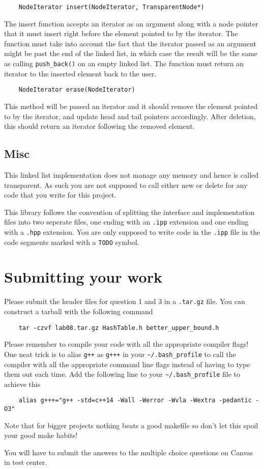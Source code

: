 \documentclass{article}
\begin{document}
\begin{lstlisting}
    NodeIterator insert(NodeIterator, TransparentNode*)
\end{lstlisting}
The insert function accepts an iterator as an argument along with a node
pointer that it must insert right before the element pointed to by the
iterator.  The function must take into account the fact that the iterator
passed as an argument might be past the end of the linked list, in which case
the result will be the same as calling \texttt{push\_back()} on an empty
linked list.  The function must return an iterator to the inserted element
back to the user.

\begin{lstlisting}
    NodeIterator erase(NodeIterator)
\end{lstlisting}
This method will be passed an iterator and it should remove the element
pointed to by the iterator, and update head and tail pointers accordingly.
After deletion, this should return an iterator following the removed element.

\subsection{Misc}
This linked list implementation does not manage any memory and hence is called
transparent.  As such you are not supposed to call either new or delete for
any code that you write for this project.

This library follows the convention of splitting the interface and
implementation files into two seperate files, one ending with an \texttt{.ipp}
extension and one ending with a \texttt{.hpp} extension.  You are only
supposed to write code in the \texttt{.ipp} file in the code segments marked
with a \texttt{TODO} symbol.


\newpage
\section{Submitting your work}
Please submit the header files for question
1 and 3 in a \texttt{.tar.gz} file.  You can construct a tarball with the
following command
\begin{lstlisting}
    tar -czvf lab08.tar.gz HashTable.h better_upper_bound.h
\end{lstlisting}

Please remember to compile your code with all the appropriate compiler flags!
One neat trick is to alias \texttt{g++} as \texttt{g+++} in your
\texttt{\~{}/.bash\_profile} to call the compiler with all the appropriate
command line flags instead of having to type them out each time.  Add the
following line to your \texttt{\~{}/.bash\_profile} file to achieve this
\begin{lstlisting}
    alias g+++="g++ -std=c++14 -Wall -Werror -Wvla -Wextra -pedantic -O3"
\end{lstlisting}

Note that for bigger projects nothing beats a good makefile so don't let this
spoil your good make habits!

You will have to submit the answers to the multiple choice questions on Canvas
in test center.
\end{document}
